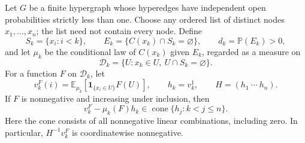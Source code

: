 \begin{lemma}\label{cmp:cone}
Let $G$ be a finite hypergraph whose hyperedges have independent open
probabilities strictly less than one.
Choose any ordered list of distinct nodes $x_1,\ldots,x_n$; the list need
not contain every node. Define
\[
 S_k=\{x_i:i<k\},\qquad
 E_k=\{C(x_k)\cap S_k=\varnothing\},\qquad
 d_k=\mathbb P(E_k)>0,
\]
and let $\mu_k$ be the conditional law of $C(x_k)$ given $E_k$, regarded
as a measure on
\[
 \mathcal D_k=\{U:x_k\in U,\ U\cap S_k=\varnothing\}.
\]
For a function $F$ on $\mathcal D_k$, let
\[
 v_k^F(i)=\mathbb E_{\mu_k}
       [\mathbf 1_{\{x_i\in U\}}F(U)],\qquad
 h_k=v_k^1,\qquad H=(h_1\ \cdots\ h_n).
\]
If $F$ is nonnegative and increasing under inclusion, then
\begin{equation}\label{cmp:cone-relation}
 v_k^F-\mu_k(F)h_k
   \in\operatorname{cone}\{h_j:k<j\le n\}.
\end{equation}
Here the cone consists of all nonnegative linear combinations, including
zero. In particular, $H^{-1}v_k^F$ is coordinatewise nonnegative.
\end{lemma}

